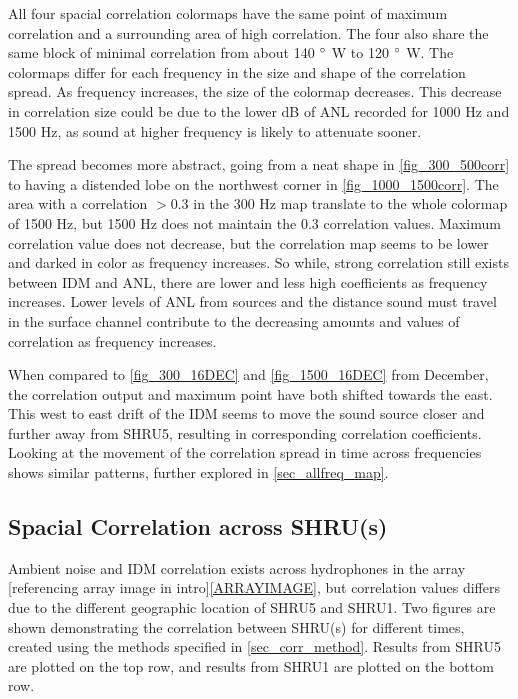 All four spacial correlation colormaps have the same point of maximum correlation and a surrounding area of high correlation. The four also share the same block of minimal correlation from about 140 $\degree$ W to 120 $\degree$ W. The colormaps differ for each frequency in the size and shape of the correlation spread. As frequency increases, the size of the colormap decreases. This decrease in correlation size could be due to the lower dB of ANL recorded for 1000 Hz and 1500 Hz, as  sound at higher frequency is likely to attenuate sooner. 

The spread becomes more abstract, going from a neat shape in \autoref{fig_300_500corr} to having a distended lobe on the northwest corner in \autoref{fig_1000_1500corr}. The area with a correlation $>0.3$ in the 300 Hz map translate to the whole colormap of 1500 Hz, but 1500 Hz does not maintain the 0.3 correlation values. Maximum correlation value does not decrease, but the correlation map seems to be lower and darked in color as frequency increases. So while, strong correlation still exists between IDM and ANL, there are lower and less high coefficients as frequency increases. Lower levels of ANL from sources and the distance sound must travel in the surface channel contribute to the decreasing amounts and values of correlation as frequency increases.

When compared to \autoref{fig_300_16DEC} and \autoref{fig_1500_16DEC} from December, the correlation output and maximum point have both shifted towards the east. This west to east drift of the IDM seems to move the sound source closer and further away from SHRU5, resulting in corresponding correlation coefficients. Looking at the movement of the correlation spread in time across frequencies shows similar patterns, further explored in \autoref{sec_allfreq_map}.


\subsection{Spacial Correlation across SHRU(s)} \label{sec_corr_shru}

Ambient noise and IDM correlation exists across hydrophones in the array [referencing array image in intro]\autoref{ARRAYIMAGE}, but correlation values differs due to the different geographic location of SHRU5 and SHRU1. Two figures are shown demonstrating the correlation between SHRU(s) for different times, created using the methods specified in \autoref{sec_corr_method}. Results from SHRU5 are plotted on the top row, and results from SHRU1 are plotted on the bottom row. 

